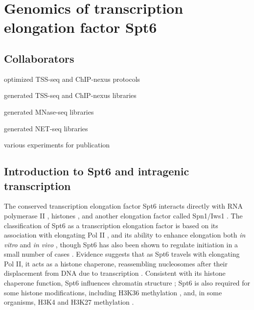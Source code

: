 \chapter{Genomics of transcription elongation factor Spt6}
\label{chapter:six}

\section{Collaborators}

\begin{description}[align=right, labelwidth=5cm, noitemsep]
    \item [Steve Doris] optimized TSS-seq and ChIP-nexus protocols
    \item [] generated TSS-seq and ChIP-nexus libraries
    \item [Olga Viktorovskaya] generated MNase-seq libraries
    \item [Magdalena Murawska] generated NET-seq libraries
    \item [Dan Spatt] various experiments for publication
\end{description}

\section{Introduction to Spt6 and intragenic transcription}

The conserved transcription elongation factor Spt6 interacts directly with RNA polymerase II \citep{close2011, diebold2011, liu2011, sdano2017, sun2010, yoh2007}, histones \citep{bortvin1996, mccullough2015}, and another elongation factor called Spn1/Iws1 \citep{diebold2010b, li2018, mcdonald2010}.
The classification of Spt6 as a transcription elongation factor is based on its association with elongating Pol II \citep{andrulis2000, ivanovska2011, kaplan2000, mayer2010}, and its ability to enhance elongation both \textit{in vitro} \citep{endoh2004} and \textit{in vivo} \citep{ardehali2009}, though Spt6 has also been shown to regulate initiation in a small number of cases \citep{adkins2006, ivanovska2011}.
Evidence suggests that as Spt6 travels with elongating Pol II, it acts as a histone chaperone, reassembling nucleosomes after their displacement from DNA due to transcription \citep{duina2011}.
Consistent with its histone chaperone function, Spt6 influences chromatin structure \citep{bortvin1996, degennaro2013, ivanovska2011, jeronimo2015, kaplan2003, perales2013, vanbakel2013}; Spt6 is also required for some histone modifications, including H3K36 methylation \citep{carrozza2005, chu2006, yoh2008, youdell2008}, and, in some organisms, H3K4 and H3K27 methylation \citep{begum2012, chen2012, degennaro2013, wang2017, wang2013}.

